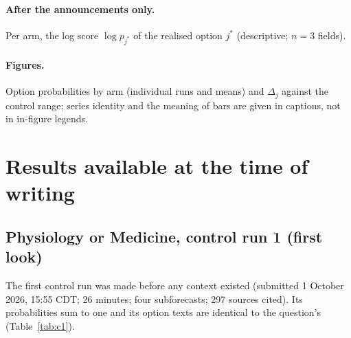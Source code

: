 \documentclass[11pt]{article}
\begin{document}
\paragraph{After the announcements only.} Per arm, the log score $\log p_{j^*}$ of the realised option $j^*$
(descriptive; $n=3$ fields).

\paragraph{Figures.} Option probabilities by arm (individual runs and means) and $\Delta_j$ against the control range;
series identity and the meaning of bars are given in captions, not in in-figure legends.
\section{Results available at the time of writing}\label{sec:results}

\subsection{Physiology or Medicine, control run 1 (first look)}

The first control run was made before any context existed (submitted 1 October 2026, 15:55 CDT; 26 minutes; four
subforecasts; 297 sources cited). Its probabilities sum to one and
its option texts are identical to the question's (Table~\ref{tab:c1}).
\end{document}
